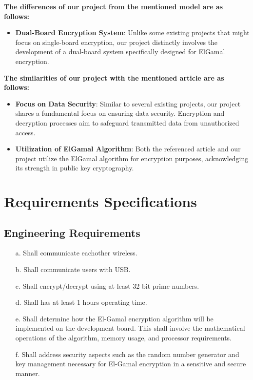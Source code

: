 \documentclass[12pt]{article}
\begin{document}
	\textbf{The differences of our project from the mentioned model are as follows:}
	\begin{itemize}
		\item \textbf{Dual-Board Encryption System}: Unlike some existing projects that might focus on single-board encryption, our project distinctly involves the development of a dual-board system specifically designed for ElGamal encryption.
	\end{itemize}
	
	\textbf{The similarities of our project with the mentioned article are as follows:}
	\begin{itemize}
		\item \textbf{Focus on Data Security}: Similar to several existing projects, our project shares a fundamental focus on ensuring data security. Encryption and decryption processes aim to safeguard transmitted data from unauthorized access.
		
		\item \textbf{Utilization of ElGamal Algorithm}: Both the referenced article and our project utilize the ElGamal algorithm for encryption purposes, acknowledging its strength in public key cryptography\cite{9166586}.
	\end{itemize}
	
	
	
	
	
	\section{Requirements Specifications}
	
	\subsection{Engineering Requirements}
	\begin{enumerate}
		\item[a.] Shall communicate eachother wireless.
		\item[b.] Shall communicate users with USB.
		\item[c.] Shall encrypt/decrypt using at least 32 bit prime numbers.
		\item[d.] Shall has at least 1 hours operating time.
		\item[e.] Shall determine how the El-Gamal encryption algorithm will be implemented on the development board. This shall involve the mathematical operations of the algorithm, memory usage, and processor requirements. 
		\item[f.] Shall address security aspects such as the random number generator and key management necessary for El-Gamal encryption in a sensitive and secure manner.
		
		
		
	\end{enumerate}
\end{document}
